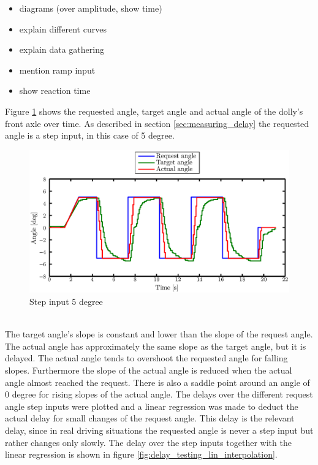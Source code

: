 \documentclass[ExampleMasters.tex]{subfiles}
\begin{document}
\begin{itemize}
	\item diagrams (over amplitude, show time)
	\item explain different curves
	\item explain data gathering
	\item mention ramp input 
	\item show reaction time
\end{itemize}
Figure \ref{fig:step_input} shows the requested angle, target angle and actual angle of the dolly's front axle over time. As described in section \ref{sec:measuring_delay} the requested angle is a step input, in this case of 5 degree.
\begin{figure}[!hbt]
	\centering
	\includegraphics[width=1\linewidth]{figures/lifted_front_5deg}
	\caption{Step input 5 degree}
	
	\label{fig:step_input}
\end{figure}\\
The target angle's slope is constant and lower than the slope of the request angle. The actual angle has approximately the same slope as the target angle, but it is delayed. The actual angle tends to overshoot the requested angle for falling slopes. Furthermore the slope of the actual angle is reduced when the actual angle almost reached the request. There is also a saddle point around an angle of 0 degree for rising slopes of the actual angle.          
The delays over the different request angle step inputs were plotted and a linear regression was made to deduct the actual delay for small changes of the request angle. This delay is the relevant delay, since in real driving situations the requested angle is never a step input but rather changes only slowly. The delay over the step inputs together with the linear regression is shown in figure \ref{fig:delay_testing_lin_interpolation}.    
\end{document}
